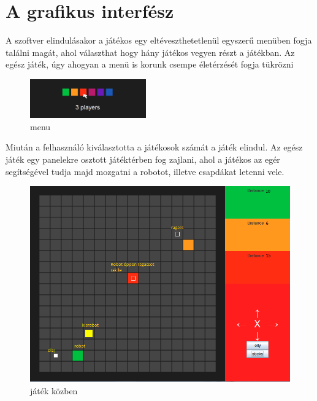 \thispagestyle{fancy}

\section{A grafikus interfész}
A szoftver elindulásakor a játékos egy eltéveszthetetlenül egyszerű menüben fogja találni magát, ahol
választhat hogy hány játékos vegyen részt a játékban. Az egész játék, úgy ahogyan a menü is korunk csempe életérzését fogja tükrözni

\begin{figure}[h]
	\begin{center}
		\includegraphics[width=5cm]{chapters/chapter11/StapelMenu.png}
		\caption{menu}
		\label{fig:Grafikus}
	\end{center}
\end{figure}

Miután a felhasználó kiválasztotta a játékosok számát a játék elindul. Az egész játék egy panelekre osztott játéktérben fog zajlani, ahol a játékos az egér segítségével tudja majd mozgatni a robotot, illetve csapdákat letenni vele.

\begin{figure}[h]
	\begin{center}
		\includegraphics[width=17cm]{chapters/chapter11/StapelInGame.png}
		\caption{játék közben}
		\label{fig:Grafikus}
	\end{center}
\end{figure}


